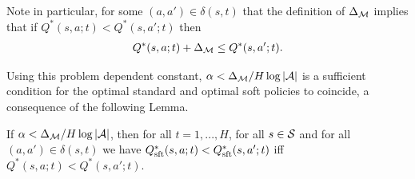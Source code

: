             Note in particular, for some $(a,a')\in\delta(s,t)$ that the definition of $\Delta_{\mathcal{M}}$ implies that if $Q^*(s,a;t)<Q^*(s,a';t)$ then 
            \begin{align}
                Q^*(s,a;t)+\Delta_{\mathcal{M}}\leq Q^*(s,a';t). \label{appeq:delta_diff}
            \end{align}

            
            Using this problem dependent constant, $\alpha < \Delta_{\mathcal{M}} / H\log |\mathcal{A}|$ is a sufficient condition for the optimal standard and optimal soft policies to coincide, a consequence of the following Lemma.

            \begin{lemma} \label{lem:soft_standard_consistent_order}
                If $\alpha < \Delta_{\mathcal{M}} / H\log |\mathcal{A}|$, then for all $t=1,...,H$, for all $s\in\mathcal{S}$ and for all $(a,a')\in\delta(s,t)$ we have $Q_{\textnormal{sft}}^*(s,a;t)<Q_{\textnormal{sft}}^*(s,a';t)$ iff $Q^*(s,a;t) < Q^*(s,a';t)$.
            \end{lemma}
